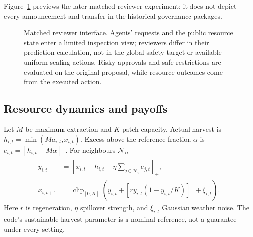 \documentclass[10pt]{article}
\begin{document}
Figure~\ref{fig:reviewer-interface} previews the later matched-reviewer
experiment; it does not depict every announcement and transfer in the
historical governance packages.

\begin{figure}[t]
\centering
{}
\caption{Matched reviewer interface. Agents' requests and the public resource state enter a limited inspection view; reviewers differ in their prediction calculation, not in the global safety target or available uniform scaling actions. Risky approvals and safe restrictions are evaluated on the original proposal, while resource outcomes come from the executed action.}
\label{fig:reviewer-interface}
\end{figure}

\subsection{Resource dynamics and payoffs}
Let $M$ be maximum extraction and $K$ patch capacity. Actual harvest is $h_{i,t}=\min(Ma_{i,t},x_{i,t})$. Excess above the reference fraction $\alpha$ is $e_{i,t}=[h_{i,t}-M\alpha]_+$. For neighbours $\mathcal N_i$,
\begin{align}
y_{i,t}&=\left[x_{i,t}-h_{i,t}-\eta\sum_{j\in\mathcal N_i}e_{j,t}\right]_+,\\
x_{i,t+1}&=\operatorname{clip}_{[0,K]}
\left(y_{i,t}+[r y_{i,t}(1-y_{i,t}/K)]_+ + \xi_{i,t}\right).
\end{align}
Here $r$ is regeneration, $\eta$ spillover strength, and $\xi_{i,t}$ Gaussian weather noise. The code's sustainable-harvest parameter is a nominal reference, not a guarantee under every setting.
\end{document}
